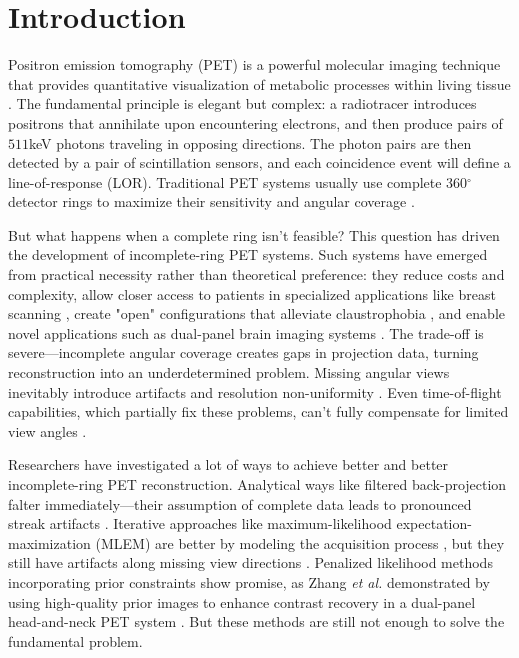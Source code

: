 \documentclass[12pt]{iopart}
\begin{document}
\section{Introduction}
\label{chap:introduction}


Positron emission tomography (PET) is a powerful molecular imaging technique that provides quantitative visualization of metabolic processes within living tissue \cite{townsend2004}. The fundamental principle is elegant but complex: a radiotracer introduces positrons that annihilate upon encountering electrons, and then produce pairs of $511$keV photons traveling in opposing directions. 
The photon pairs are then detected by a pair of scintillation sensors, and each coincidence event will define a line-of-response (LOR).
Traditional PET systems usually use complete 360$^\circ$ detector rings to maximize their sensitivity and angular coverage \cite{townsend2004}.

But what happens when a complete ring isn't feasible? This question has driven the development of incomplete-ring PET systems. Such systems have emerged from practical necessity rather than theoretical preference: they reduce costs and complexity, allow closer access to patients in specialized applications like breast scanning \cite{surti2008}, create "open" configurations that alleviate claustrophobia \cite{tashima2012, krishnamoorthy2021}, and enable novel applications such as dual-panel brain imaging systems \cite{zhang2020}. The trade-off is severe—incomplete angular coverage creates gaps in projection data, turning reconstruction into an underdetermined problem. Missing angular views inevitably introduce artifacts and resolution non-uniformity \cite{kak1988, surti2008}. Even time-of-flight capabilities, which partially fix these problems, can't fully compensate for limited view angles \cite{surti2008, krishnamoorthy2021}.

Researchers have investigated a lot of ways to achieve better and better incomplete-ring PET reconstruction. Analytical ways like filtered back-projection falter immediately—their assumption of complete data leads to pronounced streak artifacts \cite{kak1988}. Iterative approaches like maximum-likelihood expectation-maximization (MLEM) are better by modeling the acquisition process \cite{qi2006}, but they still have artifacts along missing view directions \cite{zhang2020}.
Penalized likelihood methods incorporating prior constraints show promise, as Zhang \textit{et al.} demonstrated by using high-quality prior images to enhance contrast recovery in a dual-panel head-and-neck PET system \cite{zhang2020}. But these methods are still not enough to solve the fundamental problem.
\end{document}
